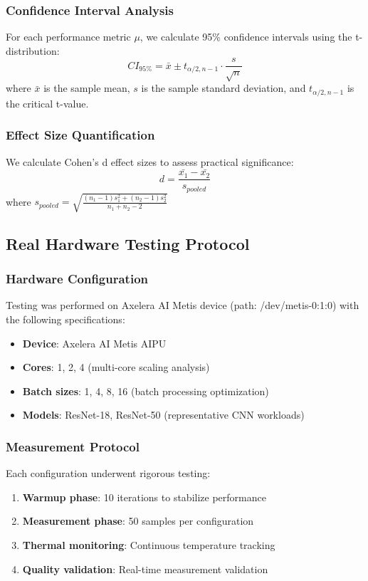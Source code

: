 \documentclass[12pt,draftcls,onecolumn]{IEEEtran}
\begin{document}
\subsubsection{Confidence Interval Analysis}
For each performance metric $\mu$, we calculate 95\% confidence intervals using the t-distribution:
\begin{equation}
CI_{95\%} = \bar{x} \pm t_{\alpha/2,n-1} \cdot \frac{s}{\sqrt{n}}
\end{equation}
where $\bar{x}$ is the sample mean, $s$ is the sample standard deviation, and $t_{\alpha/2,n-1}$ is the critical t-value.

\subsubsection{Effect Size Quantification}
We calculate Cohen's d effect sizes to assess practical significance:
\begin{equation}
d = \frac{\bar{x_1} - \bar{x_2}}{s_{pooled}}
\end{equation}
where $s_{pooled} = \sqrt{\frac{(n_1-1)s_1^2 + (n_2-1)s_2^2}{n_1+n_2-2}}$

\subsection{Real Hardware Testing Protocol}

\subsubsection{Hardware Configuration}
Testing was performed on Axelera AI Metis device (path: /dev/metis-0:1:0) with the following specifications:
\begin{itemize}
    \item \textbf{Device}: Axelera AI Metis AIPU
    \item \textbf{Cores}: 1, 2, 4 (multi-core scaling analysis)
    \item \textbf{Batch sizes}: 1, 4, 8, 16 (batch processing optimization)
    \item \textbf{Models}: ResNet-18, ResNet-50 (representative CNN workloads)
\end{itemize}

\subsubsection{Measurement Protocol}
Each configuration underwent rigorous testing:
\begin{enumerate}
    \item \textbf{Warmup phase}: 10 iterations to stabilize performance
    \item \textbf{Measurement phase}: 50 samples per configuration
    \item \textbf{Thermal monitoring}: Continuous temperature tracking
    \item \textbf{Quality validation}: Real-time measurement validation
\end{enumerate}
\end{document}
